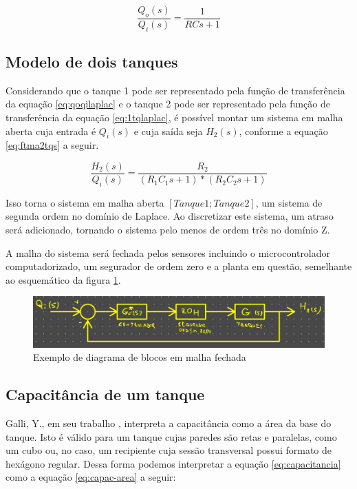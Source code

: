 \documentclass[a4paper,11pt]{article}
\begin{document}
    \begin{equation}
        \frac{Q_o(s)}{Q_i(s)} = \frac{1}{RCs+1}
        \label{eq:qoqilaplac}
    \end{equation}

\subsection{Modelo de dois tanques}

    
    
    Considerando que o tanque 1 pode ser representado pela função de transferência da equação \ref{eq:qoqilaplac} e o tanque 2 pode ser representado pela função de transferência da equação \ref{eq:1tqlaplac}, é possível montar um sistema em malha aberta cuja entrada é $Q_i(s)$ e cuja saída seja $H_2(s)$, conforme a equação \ref{eq:ftma2tqs} a seguir.
    
    \begin{equation}
        \frac{H_2(s)}{Q_i(s)} = \frac{R_2}{(R_1C_1s+1)*(R_2C_2s+1)}
        \label{eq:ftma2tqs}
    \end{equation}
    
    Isso torna o sistema em malha aberta $[Tanque 1; Tanque 2]$, um sistema de segunda ordem no domínio de Laplace. Ao discretizar este sistema, um atraso será adicionado, tornando o sistema pelo menos de ordem três no domínio Z.
    
    A malha do sistema será fechada pelos sensores  incluindo o microcontrolador computadorizado, um segurador de ordem zero e a planta em questão, semelhante ao esquemático da figura \ref{fig:mf}.
    
    \begin{figure}[H]
        \centering
        \includegraphics[width=0.6\linewidth]{img/1modelagem/malha-fechada.PNG}
        \caption{Exemplo de diagrama de blocos em malha fechada}
        \label{fig:mf}
    \end{figure}
    
    

\subsection{Capacitância de um tanque}


Galli, Y., em seu trabalho \cite{galli}, interpreta a capacitância como a área da base do tanque. Isto é válido para um tanque cujas paredes são retas e paralelas, como um cubo ou, no caso, um recipiente cuja sessão transversal possui formato de hexágono regular. Dessa forma podemos interpretar a equação \ref{eq:capacitancia} como a equação \ref{eq:capac-area} a seguir:
\end{document}
